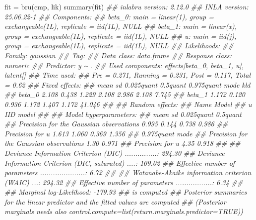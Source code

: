 \documentclass[
  letterpaper,
  DIV=11,
  numbers=noendperiod]{scrartcl}
\newenvironment{Shaded}{\begin{snugshade}}{\end{snugshade}}
\newcommand{\DocumentationTok}[1]{\textcolor[rgb]{0.37,0.37,0.37}{\textit{#1}}}
\newcommand{\FunctionTok}[1]{\textcolor[rgb]{0.28,0.35,0.67}{#1}}
\newcommand{\NormalTok}[1]{\textcolor[rgb]{0.00,0.23,0.31}{#1}}
\newcommand{\OtherTok}[1]{\textcolor[rgb]{0.00,0.23,0.31}{#1}}
\begin{document}
\begin{Shaded}
\begin{Highlighting}[]
\NormalTok{fit }\OtherTok{=} \FunctionTok{bru}\NormalTok{(cmp, lik)}
\FunctionTok{summary}\NormalTok{(fit)}
\DocumentationTok{\#\# inlabru version: 2.12.0}
\DocumentationTok{\#\# INLA version: 25.06.22{-}1}
\DocumentationTok{\#\# Components:}
\DocumentationTok{\#\# beta\_0: main = linear(1), group = exchangeable(1L), replicate = iid(1L), NULL}
\DocumentationTok{\#\# beta\_1: main = linear(x), group = exchangeable(1L), replicate = iid(1L), NULL}
\DocumentationTok{\#\# u: main = iid(j), group = exchangeable(1L), replicate = iid(1L), NULL}
\DocumentationTok{\#\# Likelihoods:}
\DocumentationTok{\#\#   Family: \textquotesingle{}gaussian\textquotesingle{}}
\DocumentationTok{\#\#     Tag: \textquotesingle{}\textquotesingle{}}
\DocumentationTok{\#\#     Data class: \textquotesingle{}data.frame\textquotesingle{}}
\DocumentationTok{\#\#     Response class: \textquotesingle{}numeric\textquotesingle{}}
\DocumentationTok{\#\#     Predictor: y \textasciitilde{} .}
\DocumentationTok{\#\#     Used components: effects[beta\_0, beta\_1, u], latent[]}
\DocumentationTok{\#\# Time used:}
\DocumentationTok{\#\#     Pre = 0.271, Running = 0.231, Post = 0.117, Total = 0.62 }
\DocumentationTok{\#\# Fixed effects:}
\DocumentationTok{\#\#         mean    sd 0.025quant 0.5quant 0.975quant  mode    kld}
\DocumentationTok{\#\# beta\_0 2.108 0.438      1.229    2.108      2.986 2.108  7.745}
\DocumentationTok{\#\# beta\_1 1.172 0.120      0.936    1.172      1.407 1.172 41.046}
\DocumentationTok{\#\# }
\DocumentationTok{\#\# Random effects:}
\DocumentationTok{\#\#   Name     Model}
\DocumentationTok{\#\#     u IID model}
\DocumentationTok{\#\# }
\DocumentationTok{\#\# Model hyperparameters:}
\DocumentationTok{\#\#                                          mean    sd 0.025quant 0.5quant}
\DocumentationTok{\#\# Precision for the Gaussian observations 0.995 0.144      0.738    0.986}
\DocumentationTok{\#\# Precision for u                         1.613 1.060      0.369    1.356}
\DocumentationTok{\#\#                                         0.975quant  mode}
\DocumentationTok{\#\# Precision for the Gaussian observations       1.30 0.971}
\DocumentationTok{\#\# Precision for u                               4.35 0.918}
\DocumentationTok{\#\# }
\DocumentationTok{\#\# Deviance Information Criterion (DIC) ...............: 294.30}
\DocumentationTok{\#\# Deviance Information Criterion (DIC, saturated) ....: 109.02}
\DocumentationTok{\#\# Effective number of parameters .....................: 6.72}
\DocumentationTok{\#\# }
\DocumentationTok{\#\# Watanabe{-}Akaike information criterion (WAIC) ...: 294.32}
\DocumentationTok{\#\# Effective number of parameters .................: 6.34}
\DocumentationTok{\#\# }
\DocumentationTok{\#\# Marginal log{-}Likelihood:  {-}179.93 }
\DocumentationTok{\#\#  is computed }
\DocumentationTok{\#\# Posterior summaries for the linear predictor and the fitted values are computed}
\DocumentationTok{\#\# (Posterior marginals needs also \textquotesingle{}control.compute=list(return.marginals.predictor=TRUE)\textquotesingle{})}
\end{Highlighting}
\end{Shaded}
\end{document}
